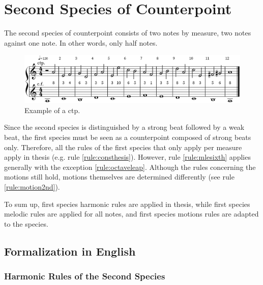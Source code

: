 \chapter{Second Species of Counterpoint}

The second species of counterpoint consists of two notes by measure, two notes against one note. In other words, only half notes.
\begin{figure}[h]
    \centering
    \includegraphics[height=\fhl]{Images/the_second_species.png}
    \caption{Example of a  ctp.  }
\end{figure}

Since the second species is distinguished by a strong beat followed by a weak beat, the first species must be seen as a counterpoint composed of strong beats only. Therefore, all the rules of the first species that only apply per measure apply in thesis (e.g. rule \ref{rule:consthesis}). However, rule \ref{rule:mlesixth} applies generally with the exception \ref{rule:octaveleap}. Although the rules concerning the motions still hold, motions themselves are determined differently (see rule \ref{rule:motion2nd}).

To sum up, first species harmonic rules are applied in thesis, while first species melodic rules are applied for all notes, and first species motions rules are adapted to the species.

\section{Formalization in English}

\subsection{Harmonic Rules of the Second Species}

